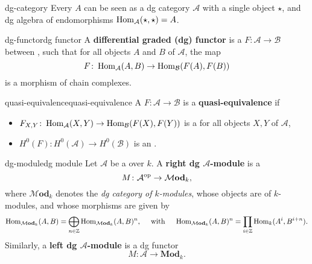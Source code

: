 \begin{example}{dg-category}
    Every  $A$ can be seen as a dg category $\mathcal{A}$ with a single object $\star$, and dg algebra of endomorphisms $\operatorname{Hom}_\mathcal{A}(\star, \star) = A$.
\end{example}

\begin{topic}{dg-functor}{dg functor}
    A \textbf{differential graded (dg) functor} is a  $F \colon \mathcal{A} \to \mathcal{B}$ between , such that for all objects $A$ and $B$ of $\mathcal{A}$, the map
    \[ F \colon \operatorname{Hom}_\mathcal{A}(A, B) \to \operatorname{Hom}_\mathcal{B}(F(A), F(B)) \]
    is a morphism of chain complexes.
\end{topic}

\begin{topic}{quasi-equivalence}{quasi-equivalence}
    A  $F \colon \mathcal{A} \to \mathcal{B}$ is a \textbf{quasi-equivalence} if
    \begin{itemize}
        \item $F_{X, Y} \colon \operatorname{Hom}_\mathcal{A}(X, Y) \to \operatorname{Hom}_\mathcal{B}(F(X), F(Y))$ is a  for all objects $X, Y$ of $\mathcal{A}$,
        \item $H^0(F) \colon H^0(\mathcal{A}) \to H^0(\mathcal{B})$ is an .
    \end{itemize}
\end{topic}

\begin{topic}{dg-module}{dg module}
    Let $\mathcal{A}$ be a   over $k$. A \textbf{right dg $\mathcal{A}$-module} is a 
    \[ M \colon \mathcal{A}^\textup{op} \to \mathcal{M}\textbf{od}_k , \]
    where $\mathcal{M}\textbf{od}_k$ denotes the \textit{dg category of $k$-modules}, whose objects are  of $k$-modules, and whose morphisms are given by
    \[ \operatorname{Hom}_{\mathcal{M}\textbf{od}_k}(A, B) = \bigoplus_{n \in \mathbb{Z}} \operatorname{Hom}_{\mathcal{M}\textbf{od}_k}(A, B)^n, \quad \textup{ with } \quad \operatorname{Hom}_{\mathcal{M}\textbf{od}_k}(A, B)^n = \prod_{i \in \mathbb{Z}} \operatorname{Hom}_k(A^i, B^{i + n}) . \]
    Similarly, a \textbf{left dg $\mathcal{A}$-module} is a dg functor
    \[ M \colon \mathcal{A} \to \textbf{Mod}_k . \]
\end{topic}

